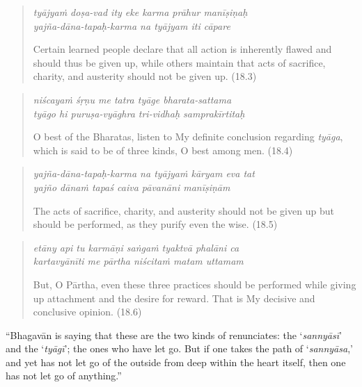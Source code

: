 \documentclass[12pt, twoside, openright]{memoir}
\begin{document}
\par
\begin{verse}
\textit{tyājyaṁ doṣa-vad ity eke karma prāhur manīṣiṇaḥ} \\
\textit{yajña-dāna-tapaḥ-karma na tyājyam iti cāpare}

\noindent Certain learned people declare that all action is inherently flawed and should thus be given up, while others maintain that acts of sacrifice, charity, and austerity should not be given up. (18.3)
\end{verse}
\par



\par
\begin{verse}
\textit{niścayaṁ śṛṇu me tatra tyāge bharata-sattama} \\
\textit{tyāgo hi puruṣa-vyāghra tri-vidhaḥ samprakīrtitaḥ}

\noindent O best of the Bharatas, listen to My definite conclusion regarding \textit{tyāga}, which is said to be of three kinds, O best among men. (18.4)
\end{verse}
\par



\par
\begin{verse}
\textit{yajña-dāna-tapaḥ-karma na tyājyaṁ kāryam eva tat} \\
\textit{yajño dānaṁ tapaś caiva pāvanāni manīṣiṇām}

\noindent The acts of sacrifice, charity, and austerity should not be given up but should be performed, as they purify even the wise. (18.5)
\end{verse}
\par



\par
\begin{verse}
\textit{etāny api tu karmāṇi saṅgaṁ tyaktvā phalāni ca} \\
\textit{kartavyānīti me pārtha niścitaṁ matam uttamam}

\noindent But, O Pārtha, even these three practices should be performed while giving up attachment and the desire for reward. That is My decisive and conclusive opinion. (18.6)
\end{verse}
\par


\enquote{Bhagavān is saying that these are the two kinds of renunciates: the \enquote{\textit{sannyāsī}} and the \enquote{\textit{tyāgī}}; the ones who have let go. But if one takes the path of \enquote{\textit{sannyāsa},} and yet has not let go of the outside from deep within the heart itself, then one has not let go of anything.}
\end{document}
